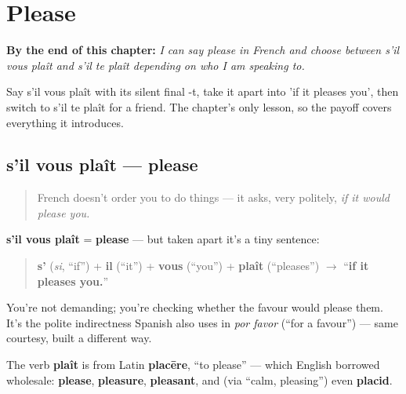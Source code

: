 
\chapter{Please}
\label{ch:fr-please}

\begin{chapteropening}
\textbf{By the end of this chapter:} \emph{I can say please in French and choose between s'il vous plaît and s'il te plaît depending on who I am speaking to.}

Say s'il vous plaît with its silent final -t, take it apart into 'if it pleases you', then switch to s'il te plaît for a friend. The chapter's only lesson, so the payoff covers everything it introduces.
\end{chapteropening}

\section[s'il vous plaît]{s'il vous plaît — please}

\label{lesson:FR-C19-sil-vous-plait}



\begin{quote}
French doesn't order you to do things — it asks, very politely, \emph{if it would please you.}
\end{quote}

\begin{cousinweb}
\textbf{s'il vous plaît} = \textbf{please} — but taken apart it's a tiny sentence:

\begin{quote}
\textbf{s'} (\emph{si}, \textquotedblleft{}if\textquotedblright{}) + \textbf{il} (\textquotedblleft{}it\textquotedblright{}) + \textbf{vous} (\textquotedblleft{}you\textquotedblright{}) + \textbf{plaît} (\textquotedblleft{}pleases\textquotedblright{}) $\to$ \textquotedblleft{}\textbf{if it pleases you.}\textquotedblright{}
\end{quote}

You're not demanding; you're checking whether the favour would please them. It's the polite indirectness Spanish also uses in \emph{por favor} (\textquotedblleft{}for a favour\textquotedblright{}) — same courtesy, built a different way.

The verb \textbf{plaît} is from Latin \textbf{placēre}, \textquotedblleft{}to please\textquotedblright{} — which English borrowed wholesale: \textbf{please}, \textbf{pleasure}, \textbf{pleasant}, and (via \textquotedblleft{}calm, pleasing\textquotedblright{}) even \textbf{placid}.
\end{cousinweb}

